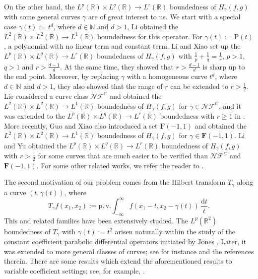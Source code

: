 \documentclass[11pt, twoside, leqno]{article}
\theoremstyle{definition}
\numberwithin{equation}{section}
\begin{document}
On the other hand, the $L^p(\mathbb{R})\times L^q(\mathbb{R})\rightarrow L^r(\mathbb{R})$ boundedness of $H_{\gamma}(f,g)$ with some general curves $\gamma$ are of great interest to us. We start with a special case $\gamma(t):=t^d$, where $d\in \mathbb{N}$ and $d>1$, Li \cite{LiX} obtained the $L^2(\mathbb{R})\times L^2(\mathbb{R})\rightarrow L^1(\mathbb{R})$ boundedness for this operator. For $\gamma(t):=\textrm{P}(t)$, a polynomial with no linear term and constant term. Li and Xiao \cite{LX} set up the $L^p(\mathbb{R})\times L^q(\mathbb{R})\rightarrow L^r(\mathbb{R})$ boundedness of $H_{\gamma}(f,g)$ with $\frac{1}{p}+\frac{1}{q}=\frac{1}{r}$, $p>1$, $q>1$ and $r>\frac{d-1}{d}$. At the same time, they showed that $r>\frac{d-1}{d}$ is sharp up to the end point. Moreover, by replacing $\gamma$ with a homogeneous curve $t^d$, where $d\in \mathbb{N}$ and $d>1$, they also showed that the range of $r$ can be extended to $r>\frac{1}{2}$. Lie \cite{Lie1} considered a curve class $\mathcal{NF}^C$ and obtained the $L^2(\mathbb{R})\times L^2(\mathbb{R})\rightarrow L^1(\mathbb{R})$ boundedness of $H_{\gamma}(f,g)$ for $\gamma\in \mathcal{NF}^C$, and it was extended to the $L^p(\mathbb{R})\times L^q(\mathbb{R})\rightarrow L^r(\mathbb{R})$ boundedness with $r\geq 1$ in \cite{Lie2}. More recently, Guo and Xiao \cite{GX} also introduced a set $\textbf{F}(-1,1)$ and obtained the $L^2(\mathbb{R})\times L^2(\mathbb{R})\rightarrow L^1(\mathbb{R})$ boundedness of $H_{\gamma}(f,g)$ for $\gamma\in \textbf{F}(-1,1)$. Li and Yu \cite{LY3} obtained the $L^p(\mathbb{R})\times L^q(\mathbb{R})\rightarrow L^r(\mathbb{R})$ boundedness of $H_{\gamma}(f,g)$ with $r>\frac{1}{2}$ for some curves that are much easier to be
verified than $\mathcal{NF}^C$ and $\textbf{F}(-1,1)$. For some other related works, we refer the reader to \cite{CDR21,CG24,LiLi23}.

The second motivation of our problem comes from the Hilbert transform $T_{\gamma}$ along a curve $(t,\gamma(t))$, where
$$T_{\gamma}f(x_1,x_2):=\mathrm{p.\,v.}\int_{-\infty}^{\infty}f(x_1-t,x_2-\gamma(t))
\,\frac{\textrm{d}t}{t}.$$
This and related families have been extensively studied. The $L^p(\mathbb{R}^2)$ boundedness of $T_{\gamma}$ with $\gamma(t):=t^2$ arisen naturally within the study of the constant coefficient parabolic  differential operators initiated by Jones \cite{J}. Later, it was extended to more general classes of curves; see for instance \cite{SW,NVWW,CCCD,CNVWW,CCVWW,CVWW} and the references therein. There are some results which extend the aforementioned results to variable coefficient settings; see, for example, \cite{CWW,BJ,GHLR,DGTZ,LiYu21,LiYu22,LYu}.
\end{document}
